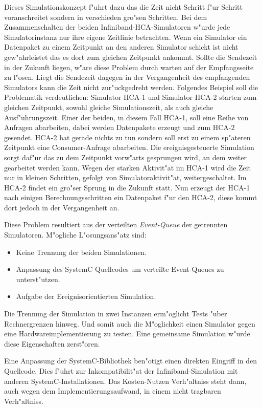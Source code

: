 Dieses Simulationskonzept f"uhrt dazu das die Zeit nicht Schritt f"ur Schritt
voranschreitet sondern in verschieden gro"sen Schritten. Bei dem Zusammenschalten der
beiden Infiniband-HCA-Simulatoren w"urde jede Simulatorinstanz nur ihre eigene 
Zeitlinie betrachten. Wenn ein Simulator ein Datenpaket zu einem Zeitpunkt an den
anderen Simulator schickt ist nicht gew"ahrleistet das es dort zum gleichen Zeitpunkt
ankommt. Sollte die Sendezeit in der Zukunft liegen, w"are diese Problem durch 
warten auf der Empfangsseite zu l"osen. Liegt die Sendezeit dagegen in der Vergangenheit
des empfangenden Simulators kann die Zeit nicht zur"uckgedreht werden. Folgendes
Beispiel soll die Problematik verdeutlichen: Simulator HCA-1 und Simulator HCA-2 starten
zum gleichen Zeitpunkt, sowohl gleiche Simulationszeit, als auch gleiche 
Ausf"uhrungszeit. Einer der beiden, in diesem Fall HCA-1, soll eine Reihe von Anfragen
abarbeiten, dabei werden Datenpakete erzeugt und zum HCA-2 gesendet. HCA-2 hat 
gerade nichts  zu tun sondern soll erst zu einem sp"ateren Zeitpunkt eine Consumer-Anfrage
abarbeiten. Die ereignisgesteuerte Simulation sorgt daf"ur das zu dem 
Zeitpunkt vorw"arts gesprungen wird, an dem weiter gearbeitet werden kann. Wegen der 
starken Aktivit"at im HCA-1 wird die Zeit nur in kleinen Schritten, gefolgt 
von Simulatoraktivit"at, weitergeschaltet. Im HCA-2 findet ein gro"ser Sprung
in die Zukunft statt. Nun erzeugt der HCA-1 nach einigen Berechnungsschritten 
ein Datenpaket f"ur den HCA-2, diese kommt dort jedoch in der Vergangenheit an.

Diese Problem resultiert aus der verteilten \emph{Event-Queue} der getrennten
Simulatoren. M"ogliche L"osungsans"atz sind:
\begin{itemize}
\item Keine Trennung der beiden Simulationen.
\item Anpassung des SystemC Quellcodes um verteilte Event-Queues zu unterst"utzen.
\item Aufgabe der Ereignisorientierten Simulation.
\end{itemize}

Die Trennung der Simulation in zwei Instanzen erm"oglicht Tests "uber Rechnergrenzen
hinweg. Und somit auch die M"oglichkeit einen Simulator gegen eine Hardwareimplementierung
zu testen. Eine gemeinsame Simulation w"urde diese Eigenschaften zerst"oren. 

Eine Anpassung der SystemC-Bibliothek ben"otigt einen direkten Eingriff in den 
Quellcode. Dies f"uhrt zur Inkompatibilit"at der Infiniband-Simulation mit anderen 
SystemC-Installationen. Das Kosten-Nutzen Verh"altniss steht dann, auch 
wegen dem Implementierungsaufwand, in einem nicht tragbaren Verh"altniss.

